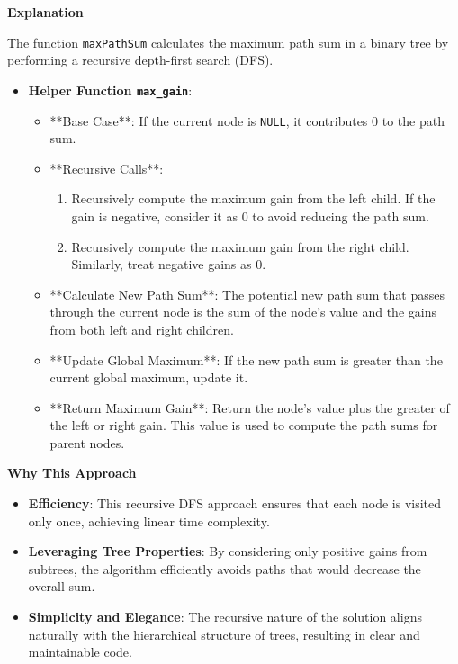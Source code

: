\textbf{Explanation}

The function \texttt{maxPathSum} calculates the maximum path sum in a binary tree by performing a recursive depth-first search (DFS). 

\begin{itemize}
    \item \textbf{Helper Function \texttt{max\_gain}}:
    \begin{itemize}
        \item **Base Case**: If the current node is \texttt{NULL}, it contributes 0 to the path sum.
        \item **Recursive Calls**: 
        \begin{enumerate}
            \item Recursively compute the maximum gain from the left child. If the gain is negative, consider it as 0 to avoid reducing the path sum.
            \item Recursively compute the maximum gain from the right child. Similarly, treat negative gains as 0.
        \end{enumerate}
        \item **Calculate New Path Sum**: The potential new path sum that passes through the current node is the sum of the node's value and the gains from both left and right children.
        \item **Update Global Maximum**: If the new path sum is greater than the current global maximum, update it.
        \item **Return Maximum Gain**: Return the node's value plus the greater of the left or right gain. This value is used to compute the path sums for parent nodes.
    \end{itemize}
\end{itemize}

\textbf{Why This Approach}

\begin{itemize}
    \item \textbf{Efficiency}: This recursive DFS approach ensures that each node is visited only once, achieving linear time complexity.
    \item \textbf{Leveraging Tree Properties}: By considering only positive gains from subtrees, the algorithm efficiently avoids paths that would decrease the overall sum.
    \item \textbf{Simplicity and Elegance}: The recursive nature of the solution aligns naturally with the hierarchical structure of trees, resulting in clear and maintainable code.
\end{itemize}

